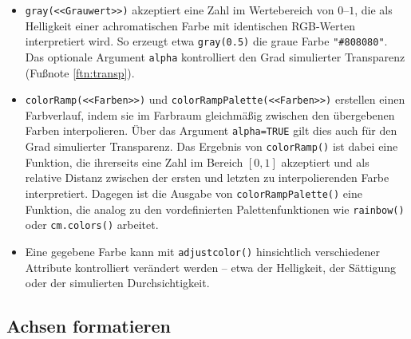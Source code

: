 \begin{itemize}
\item \lstinline!gray(<<Grauwert>>)! akzeptiert eine Zahl im Wertebereich von $0$--$1$, die als Helligkeit einer achromatischen Farbe mit identischen RGB-Werten interpretiert wird. So erzeugt etwa \lstinline!gray(0.5)! die graue Farbe \lstinline!"#808080"!. Das optionale Argument \lstinline!alpha! kontrolliert den Grad simulierter Transparenz (Fußnote \ref{ftn:transp}).
\item \lstinline!colorRamp(<<Farben>>)! und \lstinline!colorRampPalette(<<Farben>>)! erstellen einen Farbverlauf, indem sie im Farbraum gleichmäßig zwischen den übergebenen Farben interpolieren. Über das Argument \lstinline!alpha=TRUE! gilt dies auch für den Grad simulierter Transparenz. Das Ergebnis von \lstinline!colorRamp()! ist dabei eine Funktion, die ihrerseits eine Zahl im Bereich $[0,1]$ akzeptiert und als relative Distanz zwischen der ersten und letzten zu interpolierenden Farbe interpretiert. Dagegen ist die Ausgabe von \lstinline!colorRampPalette()! eine Funktion, die analog zu den vordefinierten Palettenfunktionen wie \lstinline!rainbow()! oder \lstinline!cm.colors()! arbeitet.
\item Eine gegebene Farbe kann mit \lstinline!adjustcolor()! hinsichtlich verschiedener Attribute kontrolliert verändert werden -- etwa der Helligkeit, der Sättigung oder der simulierten Durchsichtigkeit.
\end{itemize}

\subsection{Achsen formatieren}

